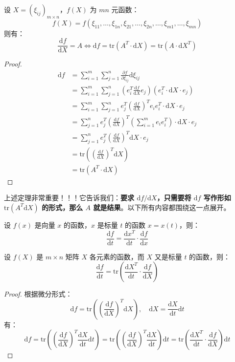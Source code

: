 \begin{theorem}[函数矩阵的微分形式]
设 $X=(\xi_{ij})_{m\times n}$，$f(X)$ 为 $mn$ 元函数：
\[
    f(X)=f(\xi_{11},\ldots,\xi_{1n},\xi_{21},\ldots,\xi_{2n},\ldots,\xi_{m1},\ldots,\xi_{mn})
\]
则有：
\[
    \frac{\mathrm df}{\mathrm dX}=A\iff \mathrm df=\mathrm{tr}(A^T\cdot\mathrm dX)=\mathrm{tr}(A\cdot \mathrm dX^T)
\]
\end{theorem}
\begin{proof}
\begin{align*}
    \mathrm df&=\sum_{i=1}^m\sum_{j=1}^n\frac{\partial f}{\partial\xi_{ij}}\mathrm d\xi_{ij}\\
    &=\sum_{i=1}^m\sum_{j=1}^n\left(e_i^T\frac{\mathrm df}{\mathrm dX}e_j\right)\left(e_i^T\cdot \mathrm dX\cdot e_j\right)\\
    &=\sum_{i=1}^m\sum_{j=1}^ne_j^T\left(\frac{\mathrm df}{\mathrm dX}\right)^Te_ie_i^T\cdot\mathrm dX\cdot e_j\\
    &=\sum_{j=1}^ne_j^T\left(\frac{\mathrm df}{\mathrm dX}\right)^T\left(\sum_{i=1}^me_ie_i^T\right)\cdot\mathrm dX\cdot e_j\\
    &=\sum_{j=1}^ne_j^T\left(\frac{\mathrm df}{\mathrm dX}\right)^T\mathrm dX\cdot e_j\\
    &=\mathrm{tr}\left(\left(\frac{\mathrm df}{\mathrm dX}\right)^T\mathrm dX\right)\\
    &=\mathrm{tr}(A^T\cdot\mathrm dX)
\end{align*}
\end{proof}

\begin{remark}
上述定理非常重要！！！它告诉我们：\textbf{要求 $\mathrm df/\mathrm dX$，只需要将 $\mathrm df$ 写作形如 $\mathrm{tr}(A^T\mathrm dX)$ 的形式，那么 $A$ 就是结果}。以下所有内容都围绕这一点展开。
\end{remark}

\begin{property}[链式法则]
设 $f(x)$ 是向量 $x$ 的函数，$x$ 是标量 $t$ 的函数 $x=x(t)$，则：
\[
    \frac{\mathrm df}{\mathrm dt}=\frac{\mathrm dx^T}{\mathrm dt}\cdot\frac{\mathrm df}{\mathrm dx}
\]
\end{property}
\begin{property}[链式法则]
设 $f(X)$ 是 $m\times n$ 矩阵 $X$ 各元素的函数，而 $X$ 又是标量 $t$ 的函数，则：
\[
    \frac{\mathrm df}{\mathrm dt}=\mathrm{tr}\left(\frac{\mathrm dX^T}{\mathrm dt}\cdot\frac{\mathrm df}{\mathrm dX}\right)
\]
\end{property}
\begin{proof}
根据微分形式：
\[
    \mathrm df=\mathrm{tr}\left(\left(\frac{\mathrm df}{\mathrm dX}\right)^T\mathrm dX\right),\quad \mathrm dX=\frac{\mathrm dX}{\mathrm dt}\mathrm dt
\]
有：
\[
    \mathrm df=\mathrm{tr}\left(\left(\frac{\mathrm df}{\mathrm dX}\right)^T\frac{\mathrm dX}{\mathrm dt}\mathrm dt\right)=\mathrm{tr}\left(\left(\frac{\mathrm df}{\mathrm dX}\right)^T\frac{\mathrm dX}{\mathrm dt}\right)\mathrm dt=\mathrm{tr}\left(\frac{\mathrm dX^T}{\mathrm dt}\cdot\frac{\mathrm df}{\mathrm dX}\right)\mathrm dt
\]
\end{proof}

